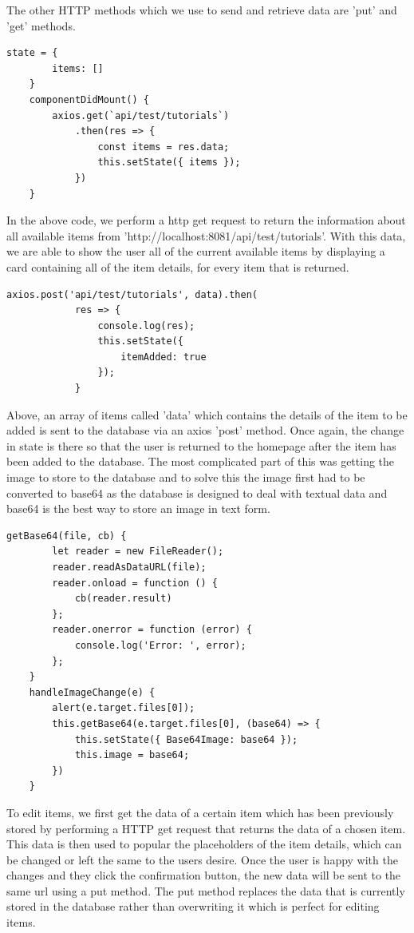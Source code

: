 The other HTTP methods which we use to send and retrieve data are 'put' and 'get' methods.
\begin{verbatim}
state = {
        items: []
    }
    componentDidMount() {
        axios.get(`api/test/tutorials`)
            .then(res => {
                const items = res.data;
                this.setState({ items });
            })
    }
\end{verbatim}
In the above code, we perform a http get request to return the information about all available items from 'http://localhost:8081/api/test/tutorials'. With this data, we are able to show the user all of the current available items by displaying a card containing all of the item details, for every item that is returned.
\begin{verbatim}
axios.post('api/test/tutorials', data).then(
            res => {
                console.log(res);
                this.setState({
                    itemAdded: true
                });
            }
\end{verbatim}
Above, an array of items called 'data' which contains the details of the item to be added is sent to the database via an axios 'post' method. Once again, the change in state is there so that the user is returned to the homepage after the item has been added to the database. The most complicated part of this was getting the image to store to the database and to solve this the image first had to be converted to base64 as the database is designed to deal with textual data and base64 is the best way to store an image in text form. 
\begin{verbatim}
getBase64(file, cb) {
        let reader = new FileReader();
        reader.readAsDataURL(file);
        reader.onload = function () {
            cb(reader.result)
        };
        reader.onerror = function (error) {
            console.log('Error: ', error);
        };
    }
    handleImageChange(e) {
        alert(e.target.files[0]);
        this.getBase64(e.target.files[0], (base64) => {
            this.setState({ Base64Image: base64 });
            this.image = base64;
        })
    }
\end{verbatim}
To edit items, we first get the data of a certain item which has been previously stored by performing a HTTP get request that returns the data of a chosen item. This data is then used to popular the placeholders of the item details, which can be changed or left the same to the users desire. Once the user is happy with the changes and they click the confirmation button, the new data will be sent to the same url using a put method. The put method replaces the data that is currently stored in the database rather than overwriting it which is perfect for editing items.
